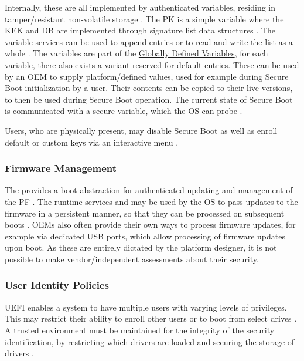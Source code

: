 Internally, these are all implemented by authenticated variables, residing in tamper\-/resistant non-volatile storage \cite[Section 32.3]{uefi-spec}.
The \ac{PK} is a simple variable where the \ac{KEK} and \ac{DB} are implemented through signature list data structures \cite[Section 32.4.1]{uefi-spec}.
The variable services can be used to append entries or to read and write the list as a whole \cite[Sections 32.3.5 and 32.5.3]{uefi-spec}.
The variables are part of the \hyperref[sec:uefi-pi:uefi:variables]{Globally Defined Variables}, for each variable, there also exists a variant reserved for default entries.
These can be used by an \ac{OEM} to supply platform\-/defined values, used for example during Secure Boot initialization by a user.
Their contents can be copied to their live versions, to then be used during Secure Boot operation.
The current state of Secure Boot is communicated with a secure variable, which the \ac{OS} can probe \cite[Section 3.3]{uefi-spec}.

Users, who are physically present, may disable Secure Boot as well as enroll default or custom keys via an interactive menu \cite[Section 3.3]{uefi-spec}.

\subsubsection{Firmware Management}

The  provides a boot abstraction for authenticated updating and management of the \ac{PF} \cite[Section 23]{uefi-spec}.
The runtime services  and  may be used by the \ac{OS} to pass updates to the firmware in a persistent manner, so that they can be processed on subsequent boots \cite[Section 23.3]{uefi-spec}.
\acp{OEM} also often provide their own ways to process firmware updates, for example via dedicated \ac{USB} ports, which allow processing of firmware updates upon boot.
As these are entirely dictated by the platform designer, it is not possible to make vendor\-/independent assessments about their security.

\subsubsection{User Identity Policies}

\ac{UEFI} enables a system to have multiple users with varying levels of privileges.
This may restrict their ability to enroll other users or to boot from select drives \cite[Section 36.1.2]{uefi-spec}.
A trusted environment must be maintained for the integrity of the security identification, by restricting which drivers are loaded and securing the storage of drivers \cite[Section 36.1.4]{uefi-spec}.